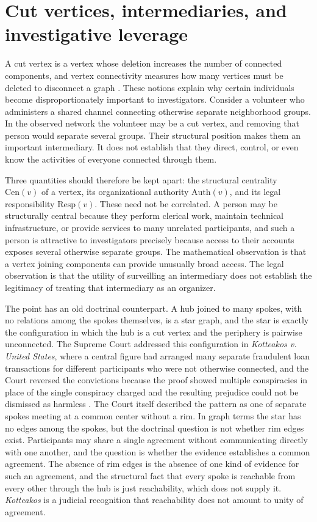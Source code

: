 \documentclass[11pt]{article}
\theoremstyle{definition}
\theoremstyle{remark}
\begin{document}
\section{Cut vertices, intermediaries, and investigative leverage}

A cut vertex is a vertex whose deletion increases the number of connected components, and vertex connectivity measures how many vertices must be deleted to disconnect a graph \cite{lavrov2026}. These notions explain why certain individuals become disproportionately important to investigators. Consider a volunteer who administers a shared channel connecting otherwise separate neighborhood groups. In the observed network the volunteer may be a cut vertex, and removing that person would separate several groups. Their structural position makes them an important intermediary. It does not establish that they direct, control, or even know the activities of everyone connected through them.

Three quantities should therefore be kept apart: the structural centrality $\mathrm{Cen}(v)$ of a vertex, its organizational authority $\mathrm{Auth}(v)$, and its legal responsibility $\mathrm{Resp}(v)$. These need not be correlated. A person may be structurally central because they perform clerical work, maintain technical infrastructure, or provide services to many unrelated participants, and such a person is attractive to investigators precisely because access to their accounts exposes several otherwise separate groups. The mathematical observation is that a vertex joining components can provide unusually broad access. The legal observation is that the utility of surveilling an intermediary does not establish the legitimacy of treating that intermediary as an organizer.

The point has an old doctrinal counterpart. A hub joined to many spokes, with no relations among the spokes themselves, is a star graph, and the star is exactly the configuration in which the hub is a cut vertex and the periphery is pairwise unconnected. The Supreme Court addressed this configuration in \emph{Kotteakos v. United States}, where a central figure had arranged many separate fraudulent loan transactions for different participants who were not otherwise connected, and the Court reversed the convictions because the proof showed multiple conspiracies in place of the single conspiracy charged and the resulting prejudice could not be dismissed as harmless \cite{kotteakos1946}. The Court itself described the pattern as one of separate spokes meeting at a common center without a rim. In graph terms the star has no edges among the spokes, but the doctrinal question is not whether rim edges exist. Participants may share a single agreement without communicating directly with one another, and the question is whether the evidence establishes a common agreement. The absence of rim edges is the absence of one kind of evidence for such an agreement, and the structural fact that every spoke is reachable from every other through the hub is just reachability, which does not supply it. \emph{Kotteakos} is a judicial recognition that reachability does not amount to unity of agreement.
\end{document}

